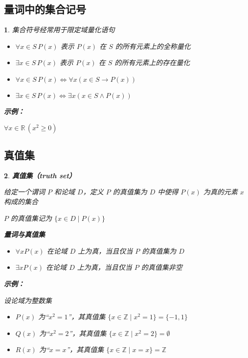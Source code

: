 \documentclass[UTF8]{report}
\theoremstyle{MyLineTheoremStyle} %
\theoremstyle{MyBlockTheoremStyle} %
\theoremstyle{MySubsubsectionStyle} %
\newtheorem{definition}{}
\begin{document}
\subsection{量词中的集合记号}

\begin{definition}
    集合符号经常用于限定域量化语句\par
    \begin{itemize}
        \item $\forall x \in S \, P(x)$ 表示 $P(x)$ 在 $S$ 的所有元素上的全称量化
        \item $\exists x \in S \, P(x)$ 表示 $P(x)$ 在 $S$ 的所有元素上的存在量化
        \item $\forall x \in S \, P(x) \iff \forall x (x \in S \rightarrow P(x))$
        \item $\exists x \in S \, P(x) \iff \exists x (x \in S \land P(x))$
    \end{itemize}

    \textbf{示例：}\par
    $\forall x \in \mathbb{R} \, (x^2 \geq 0)$\par
\end{definition}

\subsection{真值集}

\begin{definition}
    \textbf{真值集（truth set）}\par
    给定一个谓词 $P$ 和论域 $D$，定义 $P$ 的真值集为 $D$ 中使得 $P(x)$ 为真的元素 $x$ 构成的集合\par
    $P$ 的真值集记为 $\{x \in D \mid P(x)\}$\par

    \textbf{量词与真值集}\par
    \begin{itemize}
        \item $\forall x P(x)$ 在论域 $D$ 上为真，当且仅当 $P$ 的真值集为 $D$
        \item $\exists x P(x)$ 在论域 $D$ 上为真，当且仅当 $P$ 的真值集非空
    \end{itemize}

    \textbf{示例：}\par
    设论域为整数集\par
    \begin{itemize}
        \item $P(x)$ 为“$x^2 = 1$”，其真值集 $\{x \in \mathbb{Z} \mid x^2 = 1\} = \{-1, 1\}$
        \item $Q(x)$ 为“$x^2 = 2$”，其真值集 $\{x \in \mathbb{Z} \mid x^2 = 2\} = \emptyset$
        \item $R(x)$ 为“$x = x$”，其真值集 $\{x \in \mathbb{Z} \mid x = x\} = \mathbb{Z}$
    \end{itemize}
\end{definition}
\end{document}
